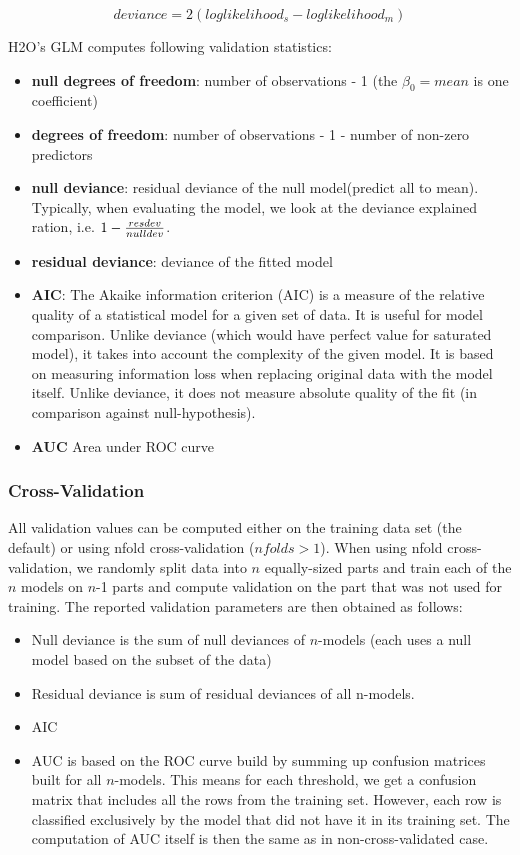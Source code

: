 \documentclass[11pt]{article}
\begin{document}
\[ deviance = 2({loglikelihood_{s}} - {loglikelihood_{m}}) \]

H2O's GLM computes following validation statistics:
\begin{itemize} 
\item \textbf{null degrees of freedom}: number of observations - 1 (the $\beta_0=mean$ is one coefficient)
\item \textbf{degrees of freedom}: number of observations - 1 - number of non-zero predictors

\item \textbf{null deviance}: residual deviance of the null model(predict all to mean). Typically, when evaluating the model, we look at the deviance explained ration, i.e. $ 1 -{ resdev \over nulldev}$.
\item \textbf{residual deviance}: deviance of the fitted model
\item \textbf{AIC}: The Akaike information criterion (AIC) is a measure of the relative quality of a statistical model for a given set of data. It is useful for model comparison. Unlike deviance (which would have perfect value for saturated model), it takes into account the complexity of the given model. It is based on measuring information loss when replacing original data with the model itself. Unlike deviance, it does not measure absolute quality of the fit (in comparison against null-hypothesis).

\item \textbf{AUC} Area under ROC curve
\end{itemize}

\subsubsection{Cross-Validation}
All validation values can be computed either on the training data set (the default) or using nfold cross-validation ($nfolds > 1$). When using nfold cross-validation, we randomly split data into $n$ equally-sized parts and train each of the $n$ models on $n$-1 parts and compute validation on the part that was not used for training. The reported validation parameters are then obtained as follows:
\begin{itemize} 
\item Null deviance is the sum of null deviances of $n$-models (each uses a null model based on the subset of the data)
\item Residual deviance is sum of residual deviances of all n-models.
\item AIC
\item AUC is based on the ROC curve build  by summing up confusion matrices built for all $n$-models.
This means for each threshold, we get a confusion matrix that includes all the rows from
the training set. However, each row is classified exclusively by the model
that did not have it in its training set. The computation of AUC itself is then the same as in non-cross-validated case. 
\end{itemize}
\end{document}

